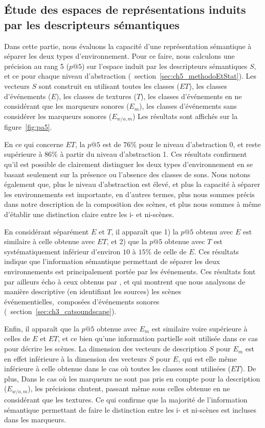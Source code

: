 \subsection{Étude des espaces de représentations induits par les descripteurs sémantiques}

Dans cette partie, nous évaluons la capacité d'une représentation sémantique à séparer les deux types d'environnement. Pour ce faire, nous calculons une précision au rang 5 ($p@5$) sur l'espace induit par les descripteurs sémantiques $S$, et ce pour chaque niveau d'abstraction (\cf~section~\ref{sec:ch5_methodoEtStat}). Les vecteurs $S$ sont construit en utilisant toutes les classes ($ET$), les classes d'événements ($E$), les classes de textures ($T$), les classes d'événements en ne considérant que les marqueurs sonores ($E_m$),  les classes d'événements sans considérer les marqueurs sonores ($E_{w/o,m}$)  Les résultats sont affichés sur la figure~\ref{fig:pa5}.

En ce qui concerne $ET$, la $p@5$ est de $76\%$ pour le niveau d'abstraction 0, et reste supérieure à $86\%$ à partir du niveau d'abstraction 1. Ces résultats confirment qu'il est possible de clairement distinguer les deux types d'environnement en se basant seulement sur la présence ou l'absence des classes de sons. Nous notons également que, plus le niveau d'abstraction est élevé, et plus la capacité à séparer les environnements est importante, en d'autres termes, plus nous sommes précis dans notre description de la composition des scènes, et plus nous sommes à même d'établir une distinction claire entre les i- et ni-scènes.

En considérant séparément $E$ et $T$, il apparaît que 1) la $p@5$ obtenu avec $E$ est similaire à celle obtenue avec $ET$, et 2) que la $p@5$ obtenue avec $T$ est systématiquement inférieur d'environ $10$ à $15\%$ de celle de $E$. Ces résultats indique que l'information sémantique permettant de séparer les deux environnements est principalement portée par les événements. Ces résultats font par ailleurs écho à ceux obtenus par  \citep{maffiolo_caracterisation_1999}, et qui montrent que nous analysons de manière descriptive (en identifiant les sources) les scènes événementielles,\ie~composées d'événements sonores (\cf~section~\ref{sec:ch3_catsoundscape}).

Enfin, il apparaît que la $p@5$ obtenue avec $E_{m}$ est similaire voire supérieure à celles de $E$ et $ET$, et ce bien qu'une information partielle soit utilisée dans ce cas pour décrire les scènes. La dimension des vecteurs de description $S$ pour $E_m$ est en effet inférieure à la dimension des vecteurs $S$ pour $E$, qui est elle même inférieure à celle obtenue dans le cas où toutes les classes sont utilisées ($ET$). De plus, Dans le cas où les marqueurs ne sont pas pris en compte pour la description ($E_{w/o,m}$), les précisions chutent, passant même sous celles obtenue en ne considérant que les textures. Ce qui confirme que la majorité de l'information sémantique permettant de faire le distinction entre les i- et ni-scènes est incluses dans les marqueurs.

